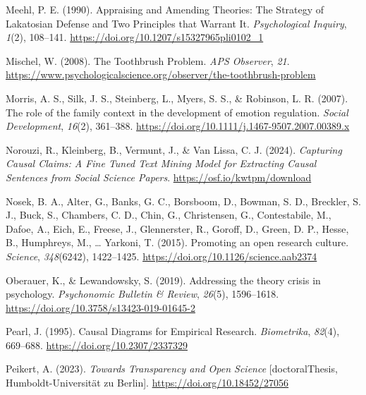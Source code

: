\documentclass[
  man, noextraspace,floatsintext]{apa7}
\newlength{\cslhangindent}
\newenvironment{CSLReferences}[2] %
 {\begin{list}{}{%
  \setlength{\itemindent}{0pt}
  \setlength{\leftmargin}{0pt}
  \setlength{\parsep}{0pt}
  \ifodd #1
   \setlength{\leftmargin}{\cslhangindent}
   \setlength{\itemindent}{-1\cslhangindent}
  \fi
  \setlength{\itemsep}{#2\baselineskip}}}
 {\end{list}}
\begin{document}
\begin{CSLReferences}{1}{0}
Meehl, P. E. (1990). Appraising and {Amending Theories}: {The Strategy} of {Lakatosian Defense} and {Two Principles} that {Warrant It}. \emph{Psychological Inquiry}, \emph{1}(2), 108--141. \url{https://doi.org/10.1207/s15327965pli0102_1}

Mischel, W. (2008). The {Toothbrush Problem}. \emph{APS Observer}, \emph{21}. \url{https://www.psychologicalscience.org/observer/the-toothbrush-problem}

Morris, A. S., Silk, J. S., Steinberg, L., Myers, S. S., \& Robinson, L. R. (2007). The role of the family context in the development of emotion regulation. \emph{Social Development}, \emph{16}(2), 361--388. \url{https://doi.org/10.1111/j.1467-9507.2007.00389.x}

Norouzi, R., Kleinberg, B., Vermunt, J., \& Van Lissa, C. J. (2024). \emph{Capturing {Causal Claims}: {A Fine Tuned Text Mining Model} for {Extracting Causal Sentences} from {Social Science Papers}}. \url{https://osf.io/kwtpm/download}

Nosek, B. A., Alter, G., Banks, G. C., Borsboom, D., Bowman, S. D., Breckler, S. J., Buck, S., Chambers, C. D., Chin, G., Christensen, G., Contestabile, M., Dafoe, A., Eich, E., Freese, J., Glennerster, R., Goroff, D., Green, D. P., Hesse, B., Humphreys, M., \ldots{} Yarkoni, T. (2015). Promoting an open research culture. \emph{Science}, \emph{348}(6242), 1422--1425. \url{https://doi.org/10.1126/science.aab2374}

Oberauer, K., \& Lewandowsky, S. (2019). Addressing the theory crisis in psychology. \emph{Psychonomic Bulletin \& Review}, \emph{26}(5), 1596--1618. \url{https://doi.org/10.3758/s13423-019-01645-2}

Pearl, J. (1995). Causal {Diagrams} for {Empirical Research}. \emph{Biometrika}, \emph{82}(4), 669--688. \url{https://doi.org/10.2307/2337329}

Peikert, A. (2023). \emph{Towards {Transparency} and {Open Science}} {[}doctoralThesis, Humboldt-Universität zu Berlin{]}. \url{https://doi.org/10.18452/27056}


\end{CSLReferences}
\end{document}

